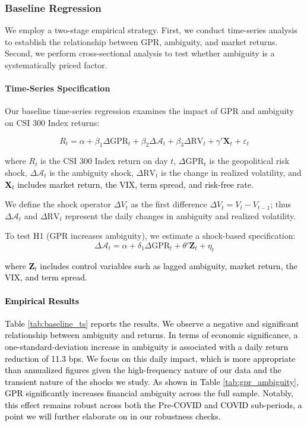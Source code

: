 \documentclass[preprint,12pt,authoryear]{elsarticle}
\begin{document}
\subsubsection{Baseline Regression}

We employ a two-stage empirical strategy. First, we conduct time-series analysis to establish the relationship between GPR, ambiguity, and market returns. Second, we perform cross-sectional analysis to test whether ambiguity is a systematically priced factor.

\paragraph{Time-Series Specification}
Our baseline time-series regression examines the impact of GPR and ambiguity on CSI 300 Index returns:

\begin{equation}
R_{t} = \alpha + \beta_1 \Delta \text{GPR}_{t} + \beta_2 \Delta \mathcal{A}_{t} + \beta_3 \Delta \text{RV}_{t} + \gamma' \mathbf{X}_{t} + \varepsilon_{t}
\end{equation}

where $R_t$ is the CSI 300 Index return on day $t$, $\Delta \text{GPR}_t$ is the geopolitical risk shock, $\Delta \mathcal{A}_t$ is the ambiguity shock, $\Delta \text{RV}_t$ is the change in realized volatility, and \textcolor{black}{$\mathbf{X}_t$ includes market return, the VIX, term spread, and risk-free rate.}

We define the shock operator $\Delta V_t$ as the first difference $\Delta V_t = V_t - V_{t-1}$; thus $\Delta \mathcal{A}_t$ and $\Delta \text{RV}_t$ represent the daily changes in ambiguity and realized volatility.

To test H1 (GPR increases ambiguity), we estimate a shock-based specification:
\begin{equation}
\Delta \mathcal{A}_{t} = \alpha + \delta_1 \Delta \text{GPR}_{t} + \theta' \mathbf{Z}_{t} + \eta_{t}
\end{equation}

\textcolor{black}{where $\mathbf{Z}_t$ includes control variables such as lagged ambiguity, market return, the VIX, and term spread.}

\paragraph{\textcolor{black}{Empirical Results}}
\textcolor{black}{Table \ref{tab:baseline_ts} reports the results. We observe a negative and significant relationship between ambiguity and returns.} \textcolor{black}{In terms of economic significance, a one-standard-deviation increase in ambiguity is associated with a daily return reduction of 11.3 bps. We focus on this daily impact, which is more appropriate than annualized figures given the high-frequency nature of our data and the transient nature of the shocks we study.} \textcolor{black}{As shown in Table \ref{tab:gpr_ambiguity}, GPR significantly increases financial ambiguity across the full sample. Notably, this effect remains robust across both the Pre-COVID and COVID sub-periods, a point we will further elaborate on in our robustness checks.}
\end{document}
